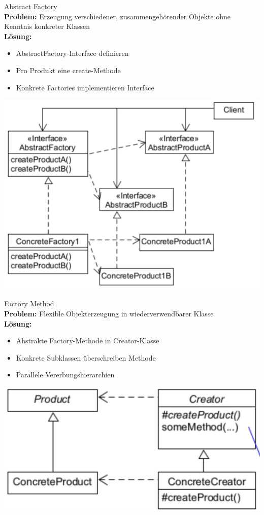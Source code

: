 \begin{concept}{Abstract Factory}\\
\textbf{Problem:} Erzeugung verschiedener, zusammengehörender Objekte ohne Kenntnis konkreter Klassen\\
\textbf{Lösung:}
\begin{itemize}
    \item AbstractFactory-Interface definieren
    \item Pro Produkt eine create-Methode
    \item Konkrete Factories implementieren Interface
\end{itemize}
\includegraphics[width=0.8\linewidth]{images/2025_01_02_73d93f10fa91ab6123dcg-13}
\end{concept}



\begin{concept}{Factory Method}\\
\textbf{Problem:} Flexible Objekterzeugung in wiederverwendbarer Klasse\\
\textbf{Lösung:}
\begin{itemize}
    \item Abstrakte Factory-Methode in Creator-Klasse
    \item Konkrete Subklassen überschreiben Methode
    \item Parallele Vererbungshierarchien
\end{itemize}
\includegraphics[width=0.8\linewidth]{images/2025_01_02_73d93f10fa91ab6123dcg-16}
\end{concept}

